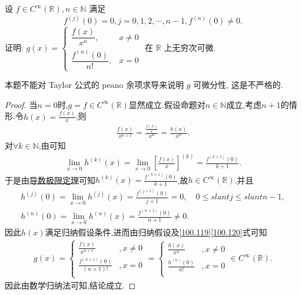 \documentclass[../../main.tex]{subfiles}
\begin{document}
\begin{example}
设 $f \in C^\infty(\mathbb{R}), n \in \mathbb{N}$ 满足
\[
f^{(j)}(0) = 0, j = 0, 1, 2, \cdots, n - 1, f^{(n)}(0) \neq 0.
\]
证明: \( g(x) = \begin{cases} 
\dfrac{f(x)}{x^n}, & x \neq 0 \\
\dfrac{f^{(n)}(0)}{n!}, & x = 0 
\end{cases} \) 在 $\mathbb{R}$ 上无穷次可微.
\end{example}
\begin{note}
本题不能对 Taylor 公式的 peano 余项求导来说明 $g$ 可微分性, 这是不严格的.
\end{note}
\begin{proof}
当$n=0$时,$g=f\in C^{\infty}(\mathbb{R})$显然成立.假设命题对$n\in \mathbb{N}$成立,考虑$n+1$的情形.令$h(x)=\frac{f(x)}{x}$,则
\begin{align}
\frac{f(x)}{x^{n+1}}=\frac{\frac{f(x)}{x}}{x^n}=\frac{h(x)}{x^n}. \tag{100.119}
\end{align}
对$\forall k\in \mathbb{N}$,由可知
\begin{align*}
\lim_{x\rightarrow 0}h^{(k)}(x)=\lim_{x\rightarrow 0}\left[ \frac{f(x)}{x} \right]^{(k)}=\frac{f^{(k+1)}(0)}{k+1}.
\end{align*}
于是由\hyperref[theorem:单侧导数极限定理]{导数极限定理}可知$h^{(k)}(x)=\frac{f^{(k+1)}(0)}{k+1}$,故$h\in C^{\infty}(\mathbb{R})$.并且
\begin{gather}
h^{(j)}(0)=\lim_{x\rightarrow 0}h^{(j)}(x)=\frac{f^{(j+1)}(0)}{j+1}=0,\quad 0\leqslant slant j\leqslant slant n-1,\nonumber \\
h^{(n)}(0)=\lim_{x\rightarrow 0}h^{(n)}(x)=\frac{f^{(n+1)}(0)}{n+1}\ne 0. \label{100.120}
\end{gather}
因此$h(x)$满足归纳假设条件,进而由归纳假设及\eqref{100.119}\eqref{100.120}式可知
\begin{align*}
g(x)=\begin{cases}
\frac{f(x)}{x^{n+1}}&,x\ne 0\\
\frac{f^{(n+1)}(0)}{(n+1)!}&,x=0\\
\end{cases}=\begin{cases}
\frac{h(x)}{x^n}&,x\ne 0\\
\frac{h^{(n)}(0)}{n!}&,x=0\\
\end{cases}\in C^{\infty}(\mathbb{R}).
\end{align*}
因此由数学归纳法可知,结论成立.
\end{proof}
\end{document}

